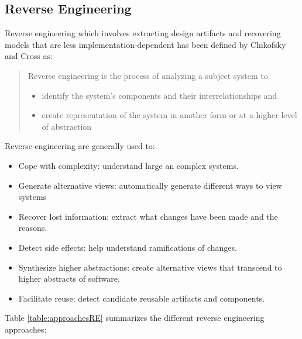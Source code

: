 \subsection{Reverse Engineering}

Reverse engineering which involves extracting design artifacts and recovering models that are less implementation-dependent has been defined by Chikofsky and Cross \cite{Chikofsky} as:

\begin{quote} 
Reverse engineering is the process of analyzing a subject system to
\begin{itemize}
\item identify the system's components and their interrelationships and
\item create representation of the system in another form or at a higher level of abstraction
\end{itemize}
\end{quote}
Reverse-engineering are generally used to:
\begin{itemize}
\item Cope with complexity: understand large an complex systems.
\item Generate alternative views: automatically generate different ways to view systems
\item Recover lost information: extract what changes have been made and the reasons.
\item Detect side effects: help understand ramifications of changes.
\item Synthesize higher abstractions:  create alternative views that transcend to higher abstracts of software.
\item Facilitate reuse: detect candidate reusable artifacts and components.
\end{itemize}

Table \ref{table:approachesRE} summarizes the different reverse engineering approaches\cite{Chikofsky}: 

